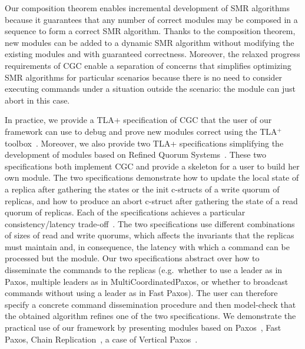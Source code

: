 Our composition theorem enables incremental development of SMR algorithms
because it guarantees that any number of correct modules may be composed in a
sequence to form a correct SMR algorithm. Thanks to the composition theorem,
new modules can be added to a dynamic SMR algorithm without modifying the
existing modules and with guaranteed correctness. Moreover, the relaxed progress
requirements of CGC enable a separation of concerns that simplifies optimizing
SMR algorithms for particular scenarios because there is no need to consider
executing commands under a situation outside the scenario: the module can just
abort in this case. 

In practice, we provide a TLA+ specification of CGC that the user of our framework can use to debug and prove new modules correct using the TLA$^+$ toolbox~\cite{TLATools}.
Moreover, we also provide two TLA+ specifications simplifying the development of modules based on Refined Quorum Systems~\cite{GuerraouiVukolic10RefinedQuorumSystems}. These two specifications both implement CGC and provide a skeleton for a user to build her own module. The two specifications demonstrate how to update the local state of a replica after gathering the states or the init c-structs of a write quorum of replicas, and how to
produce an abort c-struct after gathering the state of a read quorum of replicas. Each of the specifications achieves a particular consistency/latency trade-off~\cite{Abadi12ConsistencyTradeoffsModernDistributedDatabaseSystem}.
The two specifications use different combinations of sizes of read and write quorums, which affects the invariants that the replicas must maintain and, in consequence, the latency with which a command can be processed but the module.
Our two specifications abstract over how to disseminate the commands to the replicas (e.g.\ whether to use a leader as in Paxos, multiple leaders as in MultiCoordinatedPaxos, or whether to broadcast commands without using a leader as in Fast Paxos).
The user can therefore specify a concrete command dissemination procedure and then model-check that the obtained algorithm refines one of the two specifications.  
We demonstrate the practical use of our framework by presenting modules based on Paxos~\cite{Lamport98ParttimeParliament}, Fast Paxos\cite{Lamport06FastPaxos}, Chain Replication~\cite{RenesseSchneider04ChainReplicationSupportingHighThroughputAvailability}, a case of Vertical Paxos~\cite{LamportMalkhiZhou09VerticalPaxosPrimarybackupReplication}.

